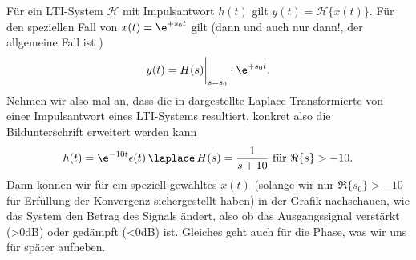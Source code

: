 \begin{Loesung}
Für ein LTI-System $\mathcal{H}$ mit Impulsantwort $h(t)$ gilt
$y(t) = \mathcal{H}\{x(t)\}$.
Für den speziellen Fall von $x(t)=\e^{+s_0 t}$ gilt (dann und auch nur dann!,
der allgemeine Fall ist )
\begin{equation}
y(t) = H(s)\bigg|_{s=s_0} \cdot \e^{+s_0 t}.
\end{equation}
%
Nehmen wir also mal an, dass die in 
dargestellte Laplace Transformierte von einer Impulsantwort eines LTI-Systems resultiert,
konkret also die Bildunterschrift erweitert werden kann
\begin{equation}
\label{eq_31AEFEF90B_LaplaceExample_hH}
h(t) = \e^{-10 t} \epsilon(t) \, \laplace \, H(s) = \frac{1}{s+10}\text{ für }\Re\{s\} > -10.
\end{equation}
Dann können wir für ein speziell gewähltes $x(t)$ (solange wir nur $\Re\{s_0\} > -10$
für Erfüllung der Konvergenz sichergestellt haben) in der Grafik 
nachschauen, wie das System den Betrag des Signals ändert, also ob das Ausgangssignal
verstärkt (>0dB) oder gedämpft (<0dB) ist. Gleiches geht auch für die Phase, was
wir uns für später aufheben.


\end{Loesung}



